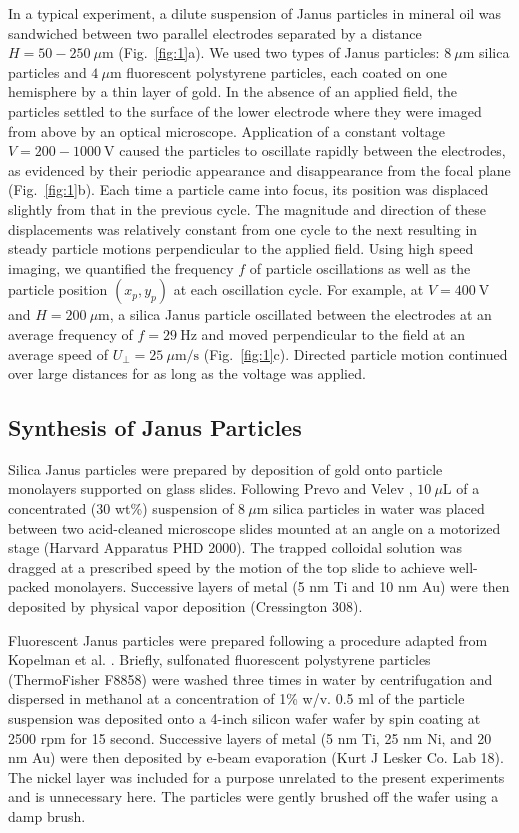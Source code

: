 In a typical experiment, a dilute suspension of Janus particles in mineral oil was sandwiched between two parallel  electrodes separated by a distance $H= 50 - 250~\mu\text{m}$ (Fig.~\ref{fig:1}a). 
We used two types of Janus particles: $8~\mu\text{m}$ silica particles and $4~\mu\text{m}$ fluorescent polystyrene particles, each coated on one hemisphere by a thin layer of gold.
In the absence of an applied field, the particles settled to the surface of the lower electrode where they were imaged from above by an optical microscope.
Application of a constant voltage $V = 200 - 1000~\text{V}$ caused the particles to oscillate rapidly between the electrodes, as evidenced by their periodic appearance and disappearance from the focal plane (Fig.~\ref{fig:1}b). 
Each time a particle came into focus, its position was displaced slightly from that in the previous cycle.
The magnitude and direction of these displacements was relatively constant from one cycle to the next resulting in steady particle motions perpendicular to the applied field.
Using high speed imaging, we quantified the frequency $f$ of particle oscillations as well as the particle position $(x_p,y_p)$ at each oscillation cycle.
For example, at $V = 400~\text{V}$ and $H=200~\mu\text{m}$, a silica Janus particle oscillated between the electrodes at an average frequency of $f = 29~\text{Hz}$ and moved perpendicular to the field at an average speed of $U_{\perp} = 25~\mu\text{m/s}$ (Fig.~\ref{fig:1}c).
Directed particle motion continued over large distances for as long as the voltage was applied.

\subsection{Synthesis of Janus Particles}

Silica Janus particles were prepared by  deposition of gold onto particle monolayers supported on glass slides.
Following Prevo and Velev \cite{prevo2004controlled}, $10~\mu\text{L}$ of a concentrated (30 wt\%) suspension of $8~\mu\text{m}$ silica particles in water was placed between two acid-cleaned microscope slides mounted at an angle on a motorized stage (Harvard Apparatus PHD 2000).
The trapped colloidal solution was dragged at a prescribed speed by the motion of the top slide to achieve well-packed monolayers.
Successive layers of metal (5 nm Ti and 10 nm Au) were then deposited by physical vapor deposition (Cressington 308).

Fluorescent Janus particles were prepared following a procedure adapted from Kopelman et al. \cite{Sinn2011}.
Briefly, sulfonated fluorescent polystyrene particles (ThermoFisher F8858) were washed three times in water by centrifugation and dispersed in methanol at a concentration of 1\% w/v. 
0.5 ml of the particle suspension was deposited onto a 4-inch silicon wafer wafer by spin coating at 2500 rpm for 15 second. 
Successive layers of metal (5 nm Ti, 25 nm Ni, and 20 nm Au) were then deposited by e-beam evaporation (Kurt J Lesker Co. Lab 18). 
The nickel layer was included for a purpose unrelated to the present experiments and is unnecessary here. 
The particles were gently brushed off the wafer using a damp brush.

